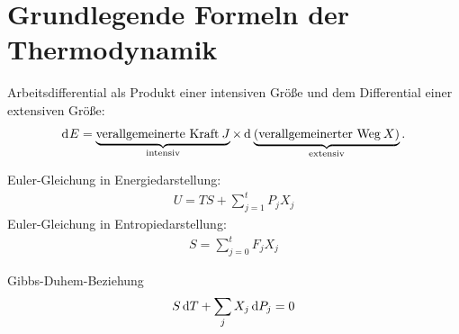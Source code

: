 \section*{Grundlegende Formeln der Thermodynamik}

Arbeitsdifferential als Produkt einer intensiven Größe und dem Differential einer extensiven Größe:
\begin{align*}
    \mathop{\mathrm{d}^{}E} = \underbrace{\text{verallgemeinerte Kraft}\: J}_{\text{intensiv}} \times \mathop{\mathrm{d}^{}\underbrace{(\text{verallgemeinerter Weg}\: X)}_{\text{extensiv}}}.
\end{align*}


Euler-Gleichung in Energiedarstellung:
\begin{align*}
    U = TS + \sum_{j=1}^t P_j X_j
\end{align*}
Euler-Gleichung in Entropiedarstellung:
\begin{align*}
    S = \sum_{j=0}^t F_j X_j
\end{align*}

Gibbs-Duhem-Beziehung
\begin{align*}
        S\mathop{}\!\mathrm{d} T + \sum_j X_j \mathop{}\!\mathrm{d} P_j = 0
\end{align*}